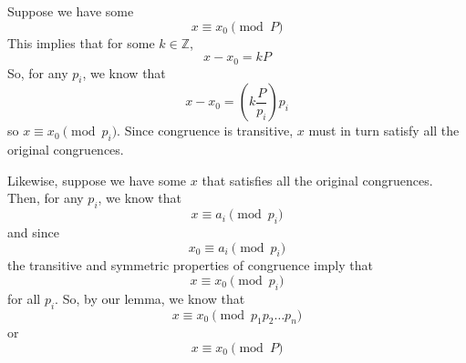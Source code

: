 \documentclass[12pt]{article}
\begin{document}
Suppose we have some
$$x \equiv x_0 \pmod{P}$$
This implies that for some $k \in \mathbb{Z}$,
$$x - x_0 = kP$$
So, for any $p_i$, we know that
$$x - x_0 = \left ( k\frac{P}{p_i} \right ) p_i$$
so $x \equiv x_0 \pmod{p_i}$.  Since congruence is transitive, $x$ must in turn satisfy all the original congruences.

Likewise, suppose we have some $x$ that satisfies all the original congruences.  Then, for any $p_i$, we know that
$$x \equiv a_i \pmod{p_i}$$
and since
$$x_0 \equiv a_i \pmod{p_i}$$
the transitive and symmetric properties of congruence imply that
$$x \equiv x_0 \pmod{p_i}$$
for all $p_i$.  So, by our lemma, we know that
$$x \equiv x_0 \pmod{p_1 p_2 \dots p_n}$$
or
$$x \equiv x_0 \pmod{P}$$
\end{document}
